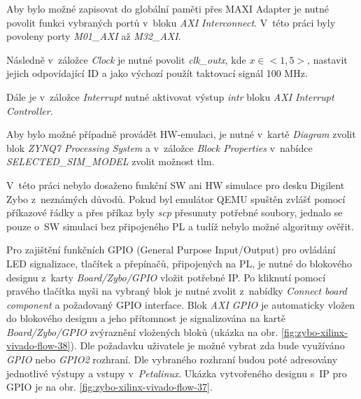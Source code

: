 \documentclass[a4paper, twoside, 11pt]{article}
\begin{document}
\begin{appendices}
		Aby bylo možné zapisovat do globální paměti přes MAXI Adapter je nutné povolit funkci vybraných portů v~bloku \textit{AXI Interconnect}. V~této práci byly povoleny porty \textit{M01\_AXI} až \textit{M32\_AXI}.\par
		Následně v~záložce \textit{Clock} je nutné povolit \textit{clk\_outx}, kde $x \in <1,5>$, nastavit jejich odpovídající ID a jako výchozí použít taktovací signál 100 MHz.\par
		Dále je v~záložce \textit{Interrupt} nutné aktivovat výstup \textit{intr} bloku \textit{AXI Interrupt Controller}.\par
		Aby bylo možné případně provádět HW-emulaci, je nutné v~kartě \textit{Diagram} zvolit blok \textit{ZYNQ7 Processing System} a v~záložce \textit{Block Properties} v~nabídce \textit{SELECTED\_SIM\_MODEL} zvolit možnost tlm. \cite{hackster-vitis-2021-1-embedded-platform-for-zybo-z7-20}\par
		V~této práci nebylo dosaženo funkční SW ani HW simulace pro desku Digilent Zybo z~neznámých důvodů. Pokud byl emulátor QEMU spuštěn zvlášť pomocí příkazové řádky a přes příkaz byly \textit{scp} přesunuty potřebné soubory, jednalo se pouze o~SW simulaci bez připojeného PL a tudíž nebylo možné algoritmy ověřit.\par
		Pro zajištění funkčních GPIO (General Purpose Input/Output) pro ovládání LED signalizace, tlačítek a přepínačů, připojených na PL, je nutné do blokového designu z~karty \textit{Board/Zybo/GPIO} vložit potřebné IP. Po kliknutí pomocí pravého tlačítka myši na vybraný blok je nutné zvolit z~nabídky \textit{Connect board component} a požadovaný GPIO interface. Blok \textit{AXI GPIO} je automaticky vložen do blokového designu a jeho přítomnost je signalizována na kartě \textit{Board/Zybo/GPIO} zvýraznění vložených bloků (ukázka na obr. \ref{fig:zybo-xilinx-vivado-flow-38}). Dle požadavku uživatele je možné vybrat zda bude využíváno \textit{GPIO} nebo \textit{GPIO2} rozhraní. Dle vybraného rozhraní budou poté adresovány jednotlivé výstupy a vstupy v~\textit{Petalinux}. Ukázka vytvořeného designu s~IP pro GPIO je na obr. \ref{fig:zybo-xilinx-vivado-flow-37}.



\end{appendices}
\end{document}
